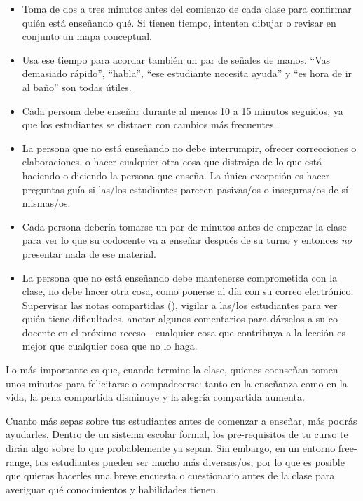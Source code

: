 \begin{itemize}

\item
  Toma de dos a tres minutos antes del comienzo de cada clase
  para confirmar quién está enseñando qué.
  Si tienen tiempo,
  intenten dibujar o revisar en conjunto un mapa conceptual.

\item
  Usa ese tiempo para acordar también un par de señales de manos.
  ``Vas demasiado rápido'',
  ``habla'',
  ``ese estudiante necesita ayuda''
  y ``es hora de ir al baño'' son todas útiles.

\item
  Cada persona debe enseñar durante al menos 10 a 15 minutos seguidos,
  ya que los estudiantes se distraen con cambios más frecuentes.

\item
  La persona que no está enseñando no debe interrumpir,
  ofrecer correcciones o elaboraciones,
  o hacer cualquier otra cosa que distraiga de lo que está haciendo o diciendo la persona que enseña.
  La única excepción es hacer preguntas guía
  si las/los estudiantes parecen pasivas/os o inseguras/os de sí mismas/os.
 
\item
  Cada persona debería tomarse un par de minutos antes de empezar la clase
  para ver lo que su co\-docente va a enseñar después de su turno
  y entonces \emph{no} presentar nada de ese material.

\item
  La persona que no está enseñando debe mantenerse comprometida con la clase,
  no debe hacer otra cosa, como ponerse al día con su correo electrónico.
  Supervisar las notas compartidas (),
  vigilar a las/los estudiantes para ver quién tiene dificultades,
  anotar algunos comentarios para dárselos a su co-docente en el próximo receso---cualquier
  cosa que contribuya a la lección es mejor que cualquier cosa que no lo haga.
 
\end{itemize}

Lo más importante es que,
cuando termine la clase, quienes co\-enseñan tomen unos minutos para felicitarse o compadecerse:
tanto en la enseñanza como en la vida,
la pena compartida disminuye y la alegría compartida aumenta.


Cuanto más sepas sobre tus estudiantes antes de comenzar a enseñar,
más podrás ayudarles.
Dentro de un sistema escolar formal,
los pre-requisitos de tu curso te dirán algo sobre
lo que probablemente ya sepan.
Sin embargo,
en un entorno free-range,
tus estudiantes pueden ser mucho más diversas/os,
por lo que es posible que quieras hacerles una breve encuesta o cuestionario antes de la clase
para averiguar qué conocimientos y habilidades tienen.

